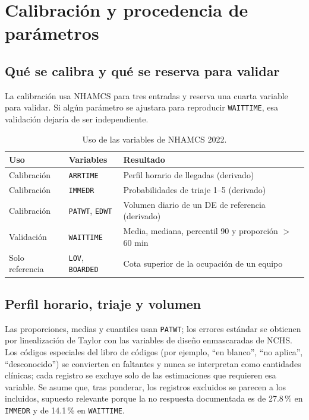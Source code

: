 \section{Calibración y procedencia de parámetros}
\label{sec:calibracion}

\subsection{Qué se calibra y qué se reserva para validar}
La calibración usa NHAMCS para tres entradas y reserva una cuarta variable para validar.
Si algún parámetro se ajustara para reproducir \texttt{WAITTIME}, esa validación dejaría de
ser independiente.

\begin{table}[ht]
\centering\small
\caption{Uso de las variables de NHAMCS 2022.}
\label{tab:usovars}
\begin{tabularx}{\linewidth}{@{}l l X@{}}
\toprule
Uso & Variables & Resultado \\
\midrule
Calibración & \texttt{ARRTIME} & Perfil horario de llegadas (derivado) \\
Calibración & \texttt{IMMEDR} & Probabilidades de triaje 1--5 (derivado) \\
Calibración & \texttt{PATWT}, \texttt{EDWT} & Volumen diario de un DE de referencia (derivado) \\
Validación & \texttt{WAITTIME} & Media, mediana, percentil 90 y proporción $>$ 60 min \\
Solo referencia & \texttt{LOV}, \texttt{BOARDED} & Cota superior de la ocupación de un equipo \\
\bottomrule
\end{tabularx}
\end{table}

\subsection{Perfil horario, triaje y volumen}
Las proporciones, medias y cuantiles usan \texttt{PATWT}; los errores estándar se obtienen
por linealización de Taylor con las variables de diseño enmascaradas de NCHS. Los códigos
especiales del libro de códigos (por ejemplo, ``en blanco'', ``no aplica'', ``desconocido'')
se convierten en faltantes y nunca se interpretan como cantidades clínicas; cada registro
se excluye solo de las estimaciones que requieren esa variable. Se asume que, tras
ponderar, los registros excluidos se parecen a los incluidos, supuesto relevante porque la
no respuesta documentada es de 27.8\,\% en \texttt{IMMEDR} y de 14.1\,\% en \texttt{WAITTIME}.

